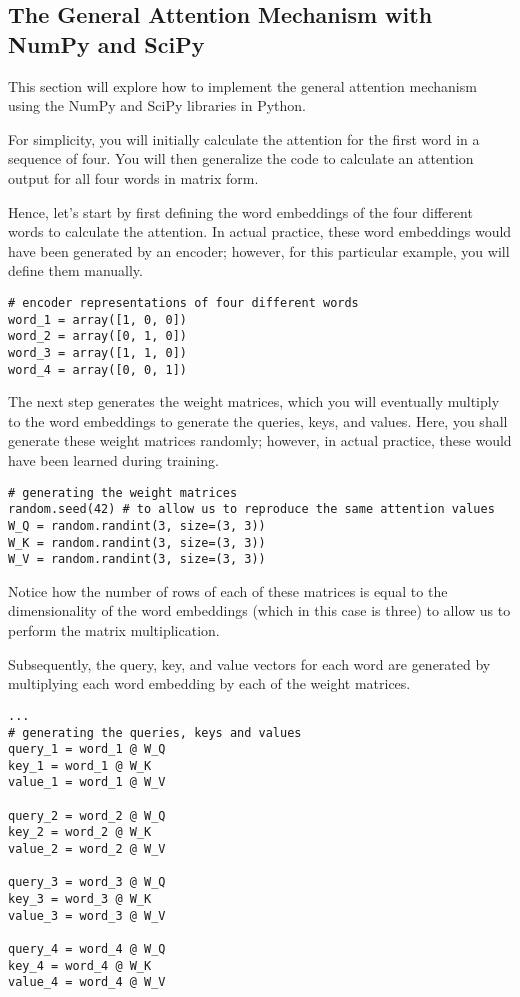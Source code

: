 \documentclass[10pt,a4paper]{article}
\begin{document}
\subsection{The General Attention Mechanism with NumPy and SciPy}

	This section will explore how to implement the general attention mechanism using the NumPy and SciPy libraries in Python. 
	
	For simplicity, you will initially calculate the attention for the first word in a sequence of four. You will then generalize the code to calculate an attention output for all four words in matrix form. 
	
	Hence, let’s start by first defining the word embeddings of the four different words to calculate the attention. In actual practice, these word embeddings would have been generated by an encoder; however, for this particular example, you will define them manually. 
	
\begin{verbatim}
# encoder representations of four different words
word_1 = array([1, 0, 0])
word_2 = array([0, 1, 0])
word_3 = array([1, 1, 0])
word_4 = array([0, 0, 1])
\end{verbatim}

The next step generates the weight matrices, which you will eventually multiply to the word embeddings to generate the queries, keys, and values. Here, you shall generate these weight matrices randomly; however, in actual practice, these would have been learned during training. 

\begin{verbatim}
# generating the weight matrices
random.seed(42) # to allow us to reproduce the same attention values
W_Q = random.randint(3, size=(3, 3))
W_K = random.randint(3, size=(3, 3))
W_V = random.randint(3, size=(3, 3))	
\end{verbatim}

Notice how the number of rows of each of these matrices is equal to the dimensionality of the word embeddings (which in this case is three) to allow us to perform the matrix multiplication.

Subsequently, the query, key, and value vectors for each word are generated by multiplying each word embedding by each of the weight matrices. 

\begin{verbatim}
...
# generating the queries, keys and values
query_1 = word_1 @ W_Q
key_1 = word_1 @ W_K
value_1 = word_1 @ W_V

query_2 = word_2 @ W_Q
key_2 = word_2 @ W_K
value_2 = word_2 @ W_V

query_3 = word_3 @ W_Q
key_3 = word_3 @ W_K
value_3 = word_3 @ W_V

query_4 = word_4 @ W_Q
key_4 = word_4 @ W_K
value_4 = word_4 @ W_V
\end{verbatim}
\end{document}
